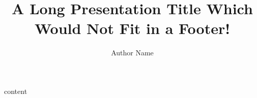 \documentclass{ltx-talk}
\author{Author Name}
\title[short-title = {Presentation title}]
  {A Long Presentation Title Which Would Not Fit in a Footer!}
\institute{Interesting Conference}
\begin{document}
\begin{frame}
  \maketitle[framestyle = wallpaper]
\end{frame}

\begin{frame}
  content
\end{frame}
\end{document}
